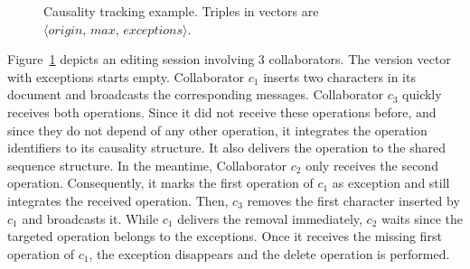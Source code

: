 \begin{figure}
  \centering
  
  \caption{\label{fig:timeline} Causality tracking example. Triples in vectors
    are $\langle origin,\,max,\, exceptions \rangle$.}
\end{figure}

Figure~\ref{fig:timeline} depicts an editing session involving 3
collaborators. The version vector with exceptions starts empty. Collaborator
$c_1$ inserts two characters in its document and broadcasts the corresponding
messages. Collaborator $c_3$ quickly receives both operations. Since it did not
receive these operations before, and since they do not depend of any other
operation, it integrates the operation identifiers to its causality
structure. It also delivers the operation to the shared sequence structure. In
the meantime, Collaborator $c_2$ only receives the second
operation. Consequently, it marks the first operation of $c_1$ as exception and
still integrates the received operation. Then, $c_3$ removes the first character
inserted by $c_1$ and broadcasts it. While $c_1$ delivers the removal
immediately, $c_2$ waits since the targeted operation belongs to the
exceptions. Once it receives the missing first operation of $c_1$, the exception
disappears and the delete operation is performed.




